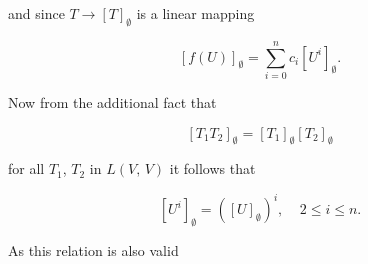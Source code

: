 and since \(T\to[T]_{\emptyset}\) is a linear mapping

\[[f(U)]_{\emptyset}=\sum_{i=0}^{n}c_{i}[U^{i}]_{\emptyset}.\]

Now from the additional fact that

\[[T_{1}T_{2}]_{\emptyset}=[T_{1}]_{\emptyset}[T_{2}]_{\emptyset}\]

for all \(T_{1}\), \(T_{2}\) in \(L(V,\,V)\) it follows that

\[[U^{i}]_{\emptyset}=([U]_{\emptyset})^{i},\ \ \ \ \ 2\leq i\leq n.\]

As this relation is also valid 